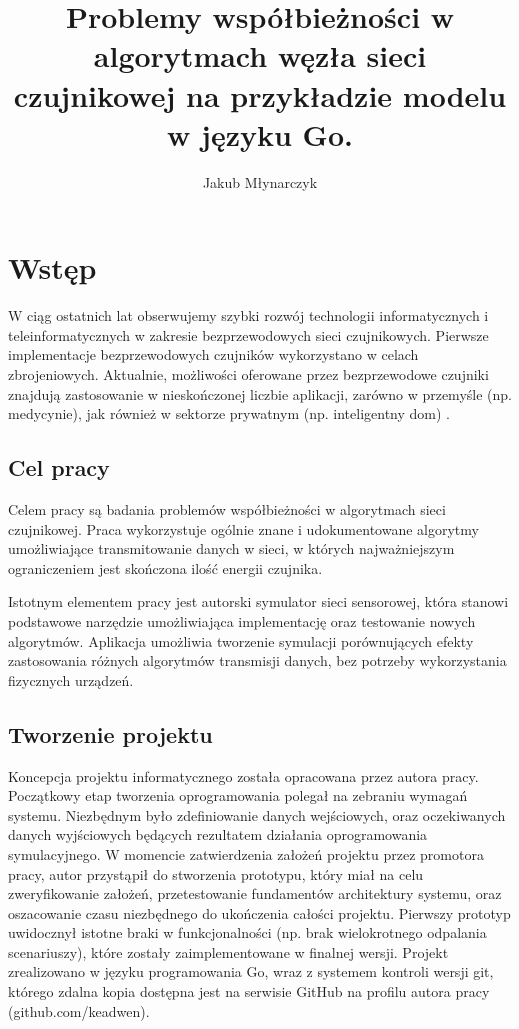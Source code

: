 \documentclass[a4paper,12pt,twoside,openany]{report}
\title{Problemy współbieżności w algorytmach węzła sieci czujnikowej na przykładzie modelu w języku Go.}
\author{Jakub Młynarczyk}
\begin{document}
\maketitle

\chapter{Wstęp}

W ciąg ostatnich lat obserwujemy szybki rozwój technologii informatycznych i teleinformatycznych w zakresie bezprzewodowych sieci czujnikowych.
Pierwsze implementacje bezprzewodowych czujników wykorzystano w celach zbrojeniowych. Aktualnie, możliwości oferowane przez bezprzewodowe 
czujniki znajdują zastosowanie w nieskończonej liczbie aplikacji, zarówno w przemyśle (np. medycynie), jak również w sektorze prywatnym (np. inteligentny dom) \cite{Shen}.


\section{Cel pracy}
Celem pracy są badania problemów współbieżności w algorytmach sieci czujnikowej. Praca wykorzystuje 
ogólnie znane i udokumentowane algorytmy umożliwiające transmitowanie danych w sieci, w których najważniejszym ograniczeniem jest skończona ilość energii czujnika.

Istotnym elementem pracy jest autorski symulator sieci sensorowej, która stanowi podstawowe narzędzie umożliwiająca implementację oraz testowanie nowych algorytmów.
Aplikacja umożliwia tworzenie symulacji porównujących efekty zastosowania różnych algorytmów transmisji danych, bez potrzeby wykorzystania fizycznych urządzeń.

\section{Tworzenie projektu}
Koncepcja projektu informatycznego została opracowana przez autora pracy. Początkowy etap tworzenia oprogramowania polegał na zebraniu wymagań systemu.
Niezbędnym było zdefiniowanie danych wejściowych, oraz oczekiwanych danych wyjściowych będących rezultatem działania oprogramowania symulacyjnego.
W momencie zatwierdzenia założeń projektu przez promotora pracy, autor przystąpił do stworzenia prototypu, który miał na celu zweryfikowanie założeń, przetestowanie fundamentów architektury systemu, 
oraz oszacowanie czasu niezbędnego do ukończenia całości projektu. Pierwszy prototyp uwidocznył istotne braki w funkcjonalności (np. brak wielokrotnego odpalania scenariuszy), które zostały
zaimplementowane w finalnej wersji. Projekt zrealizowano w języku programowania Go, wraz z systemem kontroli wersji git, którego zdalna kopia dostępna jest na serwisie GitHub
na profilu autora pracy (github.com/keadwen).
\end{document}
